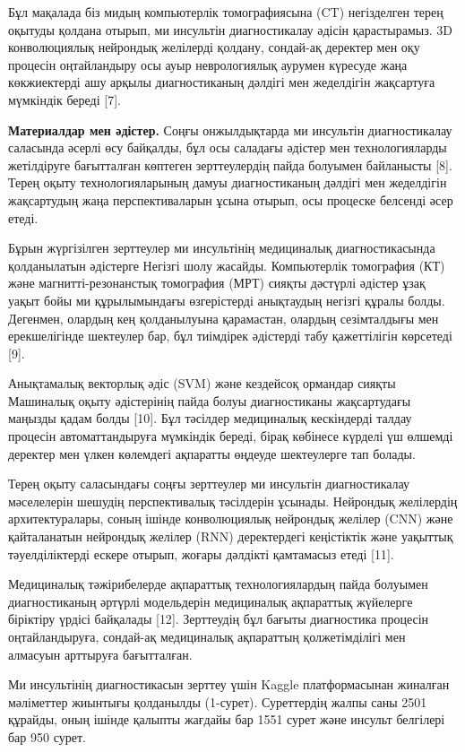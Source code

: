 Бұл мақалада біз мидың компьютерлік томографиясына (CT) негізделген
терең оқытуды қолдана отырып, ми инсультін диагностикалау әдісін
қарастырамыз. 3D конволюциялық нейрондық желілерді қолдану, сондай-ақ
деректер мен оқу процесін оңтайландыру осы ауыр неврологиялық аурумен
күресуде жаңа көкжиектерді ашу арқылы диагностиканың дәлдігі мен
жеделдігін жақсартуға мүмкіндік береді {[}7{]}.

\textbf{Материалдар мен әдістер.} Соңғы онжылдықтарда ми инсультін
диагностикалау саласында әсерлі өсу байқалды, бұл осы саладағы әдістер
мен технологияларды жетілдіруге бағытталған көптеген зерттеулердің пайда
болуымен байланысты {[}8{]}. Терең оқыту технологияларының дамуы
диагностиканың дәлдігі мен жеделдігін жақсартудың жаңа перспективаларын
ұсына отырып, осы процеске белсенді әсер етеді.

Бұрын жүргізілген зерттеулер ми инсультінің медициналық диагностикасында
қолданылатын әдістерге Негізгі шолу жасайды. Компьютерлік томография
(КТ) және магнитті-резонанстық томография (МРТ) сияқты дәстүрлі әдістер
ұзақ уақыт бойы ми құрылымындағы өзгерістерді анықтаудың негізгі құралы
болды. Дегенмен, олардың кең қолданылуына қарамастан, олардың
сезімталдығы мен ерекшелігінде шектеулер бар, бұл тиімдірек әдістерді
табу қажеттілігін көрсетеді {[}9{]}.

Анықтамалық векторлық әдіс (SVM) және кездейсоқ ормандар сияқты
Машиналық оқыту әдістерінің пайда болуы диагностиканы жақсартудағы
маңызды қадам болды {[}10{]}. Бұл тәсілдер медициналық кескіндерді
талдау процесін автоматтандыруға мүмкіндік береді, бірақ көбінесе
күрделі үш өлшемді деректер мен үлкен көлемдегі ақпаратты өңдеуде
шектеулерге тап болады.

Терең оқыту саласындағы соңғы зерттеулер ми инсультін диагностикалау
мәселелерін шешудің перспективалық тәсілдерін ұсынады. Нейрондық
желілердің архитектуралары, соның ішінде конволюциялық нейрондық желілер
(CNN) және қайталанатын нейрондық желілер (RNN) деректердегі кеңістіктік
және уақыттық тәуелділіктерді ескере отырып, жоғары дәлдікті қамтамасыз
етеді {[}11{]}.

Медициналық тәжірибелерде ақпараттық технологиялардың пайда болуымен
диагностиканың әртүрлі модельдерін медициналық ақпараттық жүйелерге
біріктіру үрдісі байқалады {[}12{]}. Зерттеудің бұл бағыты диагностика
процесін оңтайландыруға, сондай-ақ медициналық ақпараттың қолжетімділігі
мен алмасуын арттыруға бағытталған.

Ми инсультінің диагностикасын зерттеу үшін Kaggle платформасынан
жиналған мәліметтер жиынтығы қолданылды (1-сурет). Суреттердің жалпы
саны 2501 құрайды, оның ішінде қалыпты жағдайы бар 1551 сурет және
инсульт белгілері бар 950 сурет.


